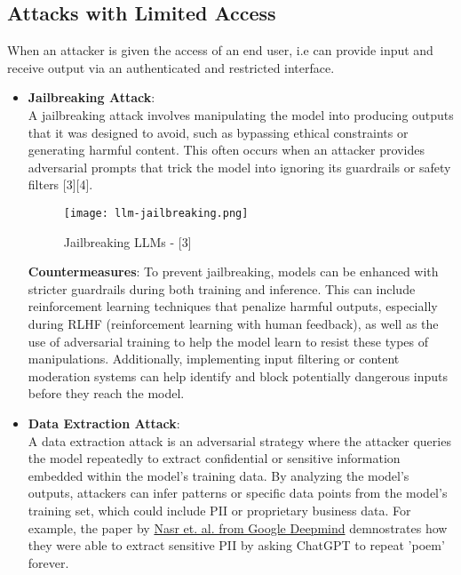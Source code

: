 \documentclass[12pt]{article}
\begin{document}
    \subsection{Attacks with Limited Access}
    When an attacker is given the access of an end user, i.e can provide input and receive output via an authenticated and restricted interface.
    \begin{itemize}
        \item \textbf{Jailbreaking Attack}: \\
        A jailbreaking attack involves manipulating the model into producing outputs that it was designed to avoid, such as bypassing ethical constraints or generating harmful content. This often occurs when an attacker provides adversarial prompts that trick the model into ignoring its guardrails or safety filters [3][4].
        \begin{figure}[ht!]
            \centering
            \texttt{[image: llm-jailbreaking.png]}
            \caption{Jailbreaking LLMs - [3]}
            \label{fig:jailbreaking-llms}
        \end{figure}

        \textbf{Countermeasures}: To prevent jailbreaking, models can be enhanced with stricter guardrails during both training and inference. This can include reinforcement learning techniques that penalize harmful outputs, especially during RLHF (reinforcement learning with human feedback), as well as the use of adversarial training to help the model learn to resist these types of manipulations. Additionally, implementing input filtering or content moderation systems can help identify and block potentially dangerous inputs before they reach the model. \\

        \item \textbf{Data Extraction Attack}: \\
        A data extraction attack is an adversarial strategy where the attacker queries the model repeatedly to extract confidential or sensitive information embedded within the model’s training data. By analyzing the model's outputs, attackers can infer patterns or specific data points from the model’s training set, which could include PII or proprietary business data. For example, the paper by \href{https://arxiv.org/pdf/2311.17035}{Nasr et. al. from Google Deepmind} demnostrates how they were able to extract sensitive PII by asking ChatGPT to repeat 'poem' forever.


\end{itemize}
\end{document}
